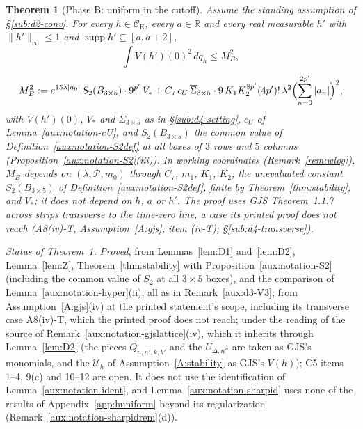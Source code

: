 \documentclass[11pt,a4paper]{article}
\theoremstyle{plain}
\newtheorem{theorem}{Theorem}[section]
\theoremstyle{definition}
\theoremstyle{plain}
\theoremstyle{definition}
\newcommand{\R}{\mathbb{R}}
\newcommand{\CE}{\mathcal{C}_{\mathrm E}}
\DeclareMathOperator{\supp}{supp}
\newcommand{\Uc}{\mathcal U}
\begin{document}
\begin{theorem}[Phase B: uniform in the cutoff]\label{thm:D4}
Assume the standing assumption of \S\ref{sub:d2-conv}.  For every $h\in\CE$, every $a\in\R$ and
every real measurable $h'$ with $\|h'\|_\infty\le1$ and $\supp h'\subseteq[a,a+2]$,
\[
 \int V(h')(0)^2\,dq_h\le M_B^2 ,
\]
\[
 M_B^2:=e^{15\lambda|a_0|}\,S_2(B_{3\times5})\cdot9^{p'}\,V_*
 +C_7\,c_U\,\overline\Sigma_{3\times5}\cdot9\,K_1K_2^{8p'}(4p')!\,\lambda^2
 \Bigl(\sum_{n=0}^{2p'}|a_n|\Bigr)^2 ,
\]
with $V(h')(0)$, $V_*$ and $\overline\Sigma_{3\times5}$ as in \S\ref{sub:d4-setting}, $c_U$ of
Lemma~\ref{aux:notation-cU}, and $S_2(B_{3\times5})$ the common value of
Definition~\ref{aux:notation-S2def} at all boxes of $3$ rows and $5$ columns
(Proposition~\ref{aux:notation-S2}(iii)).  In working coordinates (Remark~\ref{rem:wlog}), $M_B$
depends on $(\lambda,\mathscr P,m_0)$ through $C_7$, $m_1$, $K_1$, $K_2$, the unevaluated
constant $S_2(B_{3\times5})$ of Definition~\ref{aux:notation-S2def}, finite by
Theorem~\ref{thm:stability}, and $V_*$; it does not depend on $h$, $a$
or $h'$.  The proof uses GJS Theorem~1.1.7 across strips transverse to the time-zero line, a case
its printed proof does not reach (A8(iv)-T, Assumption~\ref{A:gjs}, item (iv-T); \S\ref{sub:d4-transverse}).
\end{theorem}

\emph{Status of Theorem~\ref{thm:D4}.}  \emph{Proved}, from Lemmas~\ref{lem:D1}
and~\ref{lem:D2}, Lemma~\ref{lem:Z}, Theorem~\ref{thm:stability} with
Proposition~\ref{aux:notation-S2} (including the common value of $S_2$ at all $3\times5$
boxes), and the comparison of Lemma~\ref{aux:notation-hyper}(ii), all as in
Remark~\ref{aux:d3-V3}; from Assumption~\ref{A:gjs}(iv) at the printed statement's scope,
including its transverse case A8(iv)-T, which the printed proof does not reach; under the
reading of the source of Remark~\ref{aux:notation-gjslattice}(iv), which it inherits through
Lemma~\ref{lem:D2} (the pieces $Q_{n,n',k,k'}$ and the $U_{\Delta,n''}$ are taken as GJS's
monomials, and the $\Uc_h$ of Assumption~\ref{A:stability} as GJS's $V(h)$); C5 items 1--4, 9(c)
and 10--12 are open.  It does not use the identification of Lemma~\ref{aux:notation-ident},
and Lemma~\ref{aux:notation-sharpid} uses none of the results of Appendix~\ref{app:huniform}
beyond its regularization (Remark~\ref{aux:notation-sharpidrem}(d)).
\end{document}
